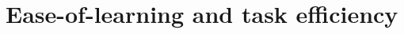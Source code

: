 \documentclass[Main]{subfiles}
\begin{document}
\section{Ease-of-learning and task efficiency}
\end{document}
